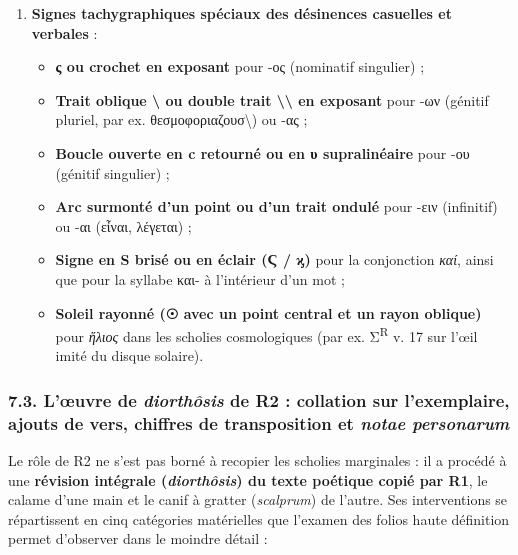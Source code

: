 \documentclass[11pt, a4paper, twoside]{article}
\renewcommand{\_}{\origunderscore\penalty0\relax}
\renewcommand{\texttt}[1]{#1}
\newcommand{\Run}{\textbf{R}\textsuperscript{1}}
\newcommand{\Rdeux}{\textbf{R}\textsuperscript{2}}
\def\Run{R1}%
\def\Rdeux{R2}%
\begin{document}
\begin{enumerate}[leftmargin=1.6em, itemsep=2pt]
  \item \textbf{Signes tachygraphiques spéciaux des désinences casuelles et verbales} :
  \begin{itemize}[leftmargin=1.5em, itemsep=2pt]
    \item \textbf{\texttt{ς} ou crochet en exposant} pour -ος (nominatif singulier) ;
    \item \textbf{Trait oblique \texttt{\textbackslash{}} ou double trait \texttt{\textbackslash{}\textbackslash{}} en exposant} pour -ων (génitif pluriel, par ex. \texttt{θεσμοφορια\allowbreak ζουσ\textbackslash{}}) ou -ας ;
    \item \textbf{Boucle ouverte en \texttt{c} retourné ou en \texttt{υ} supralinéaire} pour -ου (génitif singulier) ;
    \item \textbf{Arc surmonté d'un point ou d'un trait ondulé} pour -ειν (infinitif) ou -αι (\texttt{εἶναι}, \texttt{λέγεται}) ;
    \item \textbf{Signe en \texttt{S} brisé ou en éclair (\texttt{Ϛ} / \texttt{ϗ})} pour la conjonction \textit{καί}, ainsi que pour la syllabe και- à l'intérieur d'un mot ;
    \item \textbf{Soleil rayonné (\texttt{☉} avec un point central et un rayon oblique)} pour \textit{ἥλιος} dans les scholies cosmologiques (par ex. Σ\textsuperscript{R} v. 17 sur l'œil imité du disque solaire).
  \end{itemize}
\end{enumerate}


\subsubsection{7.3. L'œuvre de \textit{diorthôsis} de \Rdeux{} : collation sur l'exemplaire, ajouts de vers, chiffres de transposition et \textit{notae personarum}}

Le rôle de \Rdeux{} ne s'est pas borné à recopier les scholies marginales : il a procédé à une \textbf{révision intégrale (\textit{diorthôsis}) du texte poétique copié par \Run{}}, le calame d'une main et le canif à gratter (\textit{scalprum}) de l'autre. Ses interventions se répartissent en cinq catégories matérielles que l'examen des folios haute définition permet d'observer dans le moindre détail :
\end{document}
